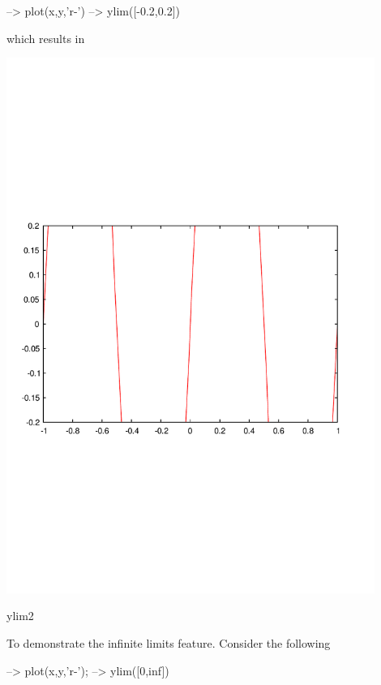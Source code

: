 \begin{DoxyVerbInclude}
--> plot(x,y,'r-')
--> ylim([-0.2,0.2])
\end{DoxyVerbInclude}


which results in  
\begin{DoxyImage}
\includegraphics[width=12cm]{ylim2}
\caption{ylim2}
\end{DoxyImage}
 To demonstrate the infinite limits feature. Consider the following


\begin{DoxyVerbInclude}
--> plot(x,y,'r-');
--> ylim([0,inf])
\end{DoxyVerbInclude}


